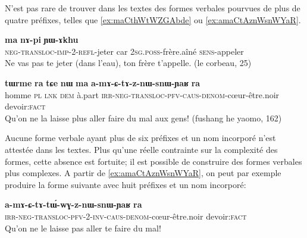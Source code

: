 \documentclass[oldfontcommands,oneside,a4paper,11pt]{article}
\newcommand{\ipa}[1]{{\phon\textbf{\mbox{#1}}}} %
\begin{document}
N'est pas rare de trouver dans les textes des formes verbales pourvues de plus de quatre préfixes, telles que \ref{ex:maCthWtWZGAbde} ou \ref{ex:amaCtAznWsnWYaR}. 


\begin{exe}
\ex \label{ex:maCthWtWZGAbde}
\gll \ipa{ma-ɕ-thɯ-tɯ-ʑɣɤ-βde}  	\ipa{ma}  	\ipa{nɤ-pi}  	\ipa{ɲɯ-ɤkhu}  \\
\textsc{neg-transloc-imp-2-refl}-jeter car \textsc{2sg.poss}-frère.aîné \textsc{sens}-appeler \\
\glt Ne vas pas te jeter (dans l'eau), ton frère t'appelle. (le corbeau, 25)
\end{exe}


\begin{exe}
\ex  \label{ex:amaCtAznWsnWYaR}
\gll
\ipa{tɯrme}  	\ipa{ra}  	\ipa{tɕe}  	\ipa{nɯ}  	\ipa{ma}  	\ipa{a-mɤ-ɕ-tɤ-z-nɯ-snɯ-ɲaʁ}  	\ipa{ra}  \\
homme \textsc{pl} \textsc{lnk} \textsc{dem} à.part \textsc{irr-neg-transloc-pfv-caus-denom}-cœur-être.noir devoir:\textsc{fact} \\
\glt Qu'on ne la laisse plus aller faire du mal aux gens! (fushang he yaomo, 162)
\end{exe}

Aucune forme verbale ayant plus de six préfixes et un nom incorporé n'est attestée dans les textes. Plus qu'une réelle contrainte sur la complexité des formes, cette absence est fortuite; il est possible de construire des formes verbales plus complexes. A partir de \ref{ex:amaCtAznWsnWYaR}, on peut par exemple produire la forme suivante avec huit préfixes et un nom incorporé:

\begin{exe}
\ex  \label{ex:amaCtAtWwGznWsnWYaR}
\gll
	\ipa{a-mɤ-ɕ-tɤ-tɯ́-wɣ-z-nɯ-snɯ-ɲaʁ}  	\ipa{ra}  \\
  \textsc{irr-neg-transloc-pfv-2-inv-caus-denom}-cœur-être.noir devoir:\textsc{fact} \\
\glt Qu'on ne le laisse pas aller te faire du mal!
\end{exe}
\end{document}
